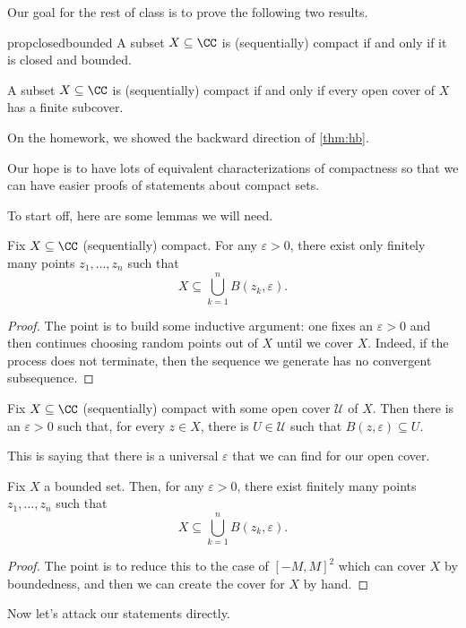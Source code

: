 Our goal for the rest of class is to prove the following two results.
\begin{restatable}{prop}{closedbounded}
	A subset $X\subseteq\CC$ is (sequentially) compact if and only if it is closed and bounded.
\end{restatable}
\begin{theorem} \label{thm:hb}
	A subset $X\subseteq\CC$ is (sequentially) compact if and only if every open cover of $X$ has a finite subcover.
\end{theorem}
On the homework, we showed the backward direction of \autoref{thm:hb}.
\begin{remark}
	Our hope is to have lots of equivalent characterizations of compactness so that we can have easier proofs of statements about compact sets.
\end{remark}
To start off, here are some lemmas we will need.
\begin{lemma}
	Fix $X\subseteq\CC$ (sequentially) compact. For any $\varepsilon>0$, there exist only finitely many points $z_1,\ldots,z_n$ such that
	\[X\subseteq\bigcup_{k=1}^nB(z_k,\varepsilon).\]
\end{lemma}
\begin{proof}
	The point is to build some inductive argument: one fixes an $\varepsilon>0$ and then continues choosing random points out of $X$ until we cover $X$. Indeed, if the process does not terminate, then the sequence we generate has no convergent subsequence.
\end{proof}
\begin{lemma}
	Fix $X\subseteq\CC$ (sequentially) compact with some open cover $\mathcal U$ of $X$. Then there is an $\varepsilon>0$ such that, for every $z\in X$, there is $U\in\mathcal U$ such that $B(z,\varepsilon)\subseteq U$.
\end{lemma}
This is saying that there is a universal $\varepsilon$ that we can find for our open cover.
\begin{lemma}
	Fix $X$ a bounded set. Then, for any $\varepsilon>0$, there exist finitely many points $z_1,\ldots,z_n$ such that
	\[X\subseteq\bigcup_{k=1}^nB(z_k,\varepsilon).\]
\end{lemma}
\begin{proof}
	The point is to reduce this to the case of $[-M,M]^2$ which can cover $X$ by boundedness, and then we can create the cover for $X$ by hand.
\end{proof}
Now let's attack our statements directly.
\closedbounded*
